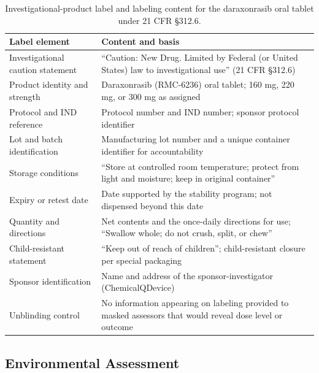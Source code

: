 \begin{table}[t]
\centering
\caption{Investigational-product label and labeling content for the daraxonrasib
oral tablet under 21 CFR \S 312.6.}
\label{tab:cmc-labeling}
\begin{tabularx}{\textwidth}{L{4.6cm} Y}
\toprule
\textbf{Label element} & \textbf{Content and basis} \\
\midrule
Investigational caution statement & ``Caution: New Drug. Limited by Federal (or United States) law to investigational use'' (21 CFR \S 312.6) \\
Product identity and strength & Daraxonrasib (RMC-6236) oral tablet; 160 mg, 220 mg, or 300 mg as assigned \\
Protocol and IND reference & Protocol number and IND number; sponsor protocol identifier \\
Lot and batch identification & Manufacturing lot number and a unique container identifier for accountability \\
Storage conditions & ``Store at controlled room temperature; protect from light and moisture; keep in original container'' \\
Expiry or retest date & Date supported by the stability program; not dispensed beyond this date \\
Quantity and directions & Net contents and the once-daily directions for use; ``Swallow whole; do not crush, split, or chew'' \\
Child-resistant statement & ``Keep out of reach of children''; child-resistant closure per special packaging \\
Sponsor identification & Name and address of the sponsor-investigator (ChemicalQDevice) \\
Unblinding control & No information appearing on labeling provided to masked assessors that would reveal dose level or outcome \\
\bottomrule
\end{tabularx}
\end{table}

\subsection{Environmental Assessment}

